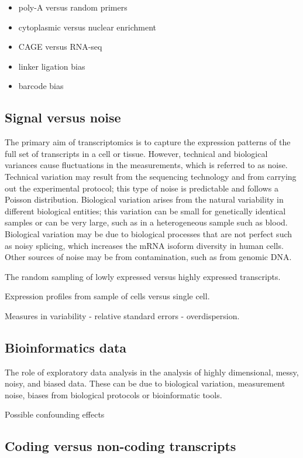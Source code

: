 \begin{itemize}
   \item poly-A versus random primers
   \item cytoplasmic versus nuclear enrichment
   \item CAGE versus RNA-seq
   \item linker ligation bias
   \item barcode bias
\end{itemize}

\subsection{Signal versus noise}

The primary aim of transcriptomics is to capture the expression patterns of the full set of transcripts in a cell or tissue. However, technical and biological variances cause fluctuations in the measurements, which is referred to as noise. Technical variation may result from the sequencing technology and from carrying out the experimental protocol; this type of noise is predictable and follows a Poisson distribution. Biological variation arises from the natural variability in different biological entities; this variation can be small for genetically identical samples or can be very large, such as in a heterogeneous sample such as blood. Biological variation may be due to biological processes that are not perfect such as noisy splicing, which increases the mRNA isoform diversity in human cells\cite{pmid21151575}. Other sources of noise may be from contamination, such as from genomic DNA.

The random sampling of lowly expressed versus highly expressed transcripts.

Expression profiles from sample of cells versus single cell.

Measures in variability - relative standard errors - overdispersion.

\subsection{Bioinformatics data}

The role of exploratory data analysis in the analysis of highly dimensional, messy, noisy, and biased data. These can be due to biological variation, measurement noise, biases from biological protocols or bioinformatic tools.

Possible confounding effects

\subsection{Coding versus non-coding transcripts}

